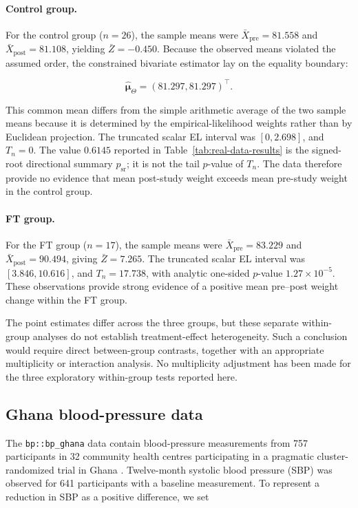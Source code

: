 \documentclass[11pt]{article}
\theoremstyle{remark}
\begin{document}
\paragraph{Control group.} For the control group ($n=26$), the sample means were $\bar X_{\mathrm{pre}}=81.558$ and $\bar X_{\mathrm{post}}=81.108$, yielding $\bar Z=-0.450$. Because the observed means violated the assumed order, the constrained bivariate estimator lay on the equality boundary:

$$
\widehat{\boldsymbol{\mu}}_{\Theta}
=
(81.297,81.297)^\top.
$$

This common mean differs from the simple arithmetic average of the two sample means because it is determined by the empirical-likelihood weights rather than by Euclidean projection. The truncated scalar EL interval was $[0,2.698]$, and $T_n=0$. The value $0.6145$ reported in Table~\ref{tab:real-data-results} is the signed-root directional summary $p_{\mathrm{sr}}$; it is not the tail $p$-value of $T_n$. The data therefore provide no evidence that mean post-study weight exceeds mean pre-study weight in the control group.

\paragraph{FT group.} For the FT group ($n=17$), the sample means were $\bar X_{\mathrm{pre}}=83.229$ and $\bar X_{\mathrm{post}}=90.494$, giving $\bar Z=7.265$. The truncated scalar EL interval was $[3.846,10.616]$, and $T_n=17.738$, with analytic one-sided $p$-value $1.27\times10^{-5}$. These observations provide strong evidence of a positive mean pre--post weight change within the FT group.

The point estimates differ across the three groups, but these separate within-group analyses do not establish treatment-effect heterogeneity. Such a conclusion would require direct between-group contrasts, together with an appropriate multiplicity or interaction analysis. No multiplicity adjustment has been made for the three exploratory within-group tests reported here.

\subsection{Ghana blood-pressure data}

The \texttt{bp::bp\_ghana} data contain blood-pressure measurements from 757 participants in 32 community health centres participating in a pragmatic cluster-randomized trial in Ghana \citet{schwenck2022bp}. Twelve-month systolic blood pressure (SBP) was observed for 641 participants with a baseline measurement. To represent a reduction in SBP as a positive difference, we set
\end{document}

